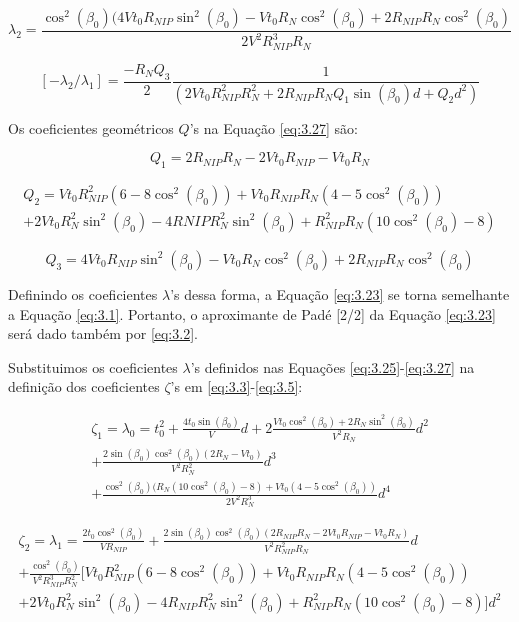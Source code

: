 \begin{equation}
\label{eq:6.26}
\lambda_2=\frac{\cos^2(\beta_0)(4Vt_0R_{NIP}\sin^2(\beta_0)-Vt_0R_N\cos^2(\beta_0)+2R_{NIP}R_N\cos^2(\beta_0)}{2V^2R_{NIP}^3R_N}
\end{equation}

\begin{equation}
\label{eq:6.27}
 [-\lambda_2/\lambda_1]=\frac{-R_NQ_3}{2}\frac{1}{(2Vt_0R_{NIP}^2R_N^2+2R_{NIP}R_NQ_1\sin(\beta_0)d+Q_2d^2)}
\end{equation}

Os coeficientes geométricos $Q$'s na Equação \ref{eq:3.27} são:

\begin{equation}
\label{eq:6.28}
 Q_1=2R_{NIP}R_N-2Vt_0R_{NIP}-Vt_0R_N
\end{equation}

\begin{multline}
\label{eq:6.29}
 Q_2=Vt_0R_{NIP}^2(6-8\cos^2(\beta_0))+Vt_0R_{NIP}R_N(4-5\cos^2(\beta_0)) \\
 +2Vt_0R_N^2\sin^2(\beta_0)-4R{NIP}R_N^2\sin^2(\beta_0)+R_{NIP}^2R_N(10\cos^2(\beta_0)-8)
\end{multline}

\begin{equation}
\label{eq:6.30}
 Q_3=4Vt_0R_{NIP}\sin^2(\beta_0)-Vt_0R_N\cos^2(\beta_0)+2R_{NIP}R_N\cos^2(\beta_0)
\end{equation}

Definindo os coeficientes $\lambda$'s dessa forma, a Equação \ref{eq:3.23} se torna semelhante a
Equação \ref{eq:3.1}. Portanto,
o aproximante de Padé [2/2] da Equação \ref{eq:3.23} será dado também por \ref{eq:3.2}.

Substituimos os coeficientes $\lambda$'s definidos nas Equações
\ref{eq:3.25}-\ref{eq:3.27} na definição dos coeficientes $\zeta$'s
em \ref{eq:3.3}-\ref{eq:3.5}:

\begin{multline}
\label{eq:6.31}
 \zeta_1=\lambda_0=t_0^2+\frac{4t_0\sin(\beta_0)}{V}d+2\frac{Vt_0\cos^2(\beta_0)+2R_N\sin^2(\beta_0)}{V^2R_N}d^2 \\
+\frac{2\sin(\beta_0)\cos^2(\beta_0)(2R_N-Vt_0)}{V^2R_N^2}d^3 \\
+\frac{\cos^2(\beta_0)(R_N(10\cos^2(\beta_0)-8)+Vt_0(4-5\cos^2(\beta_0))}{2V^2R_N^3}d^4 
\end{multline}

\begin{multline}
\label{eq:6.32}
 \zeta_2=\lambda_1=\frac{2t_0\cos^2(\beta_0)}{VR_{NIP}}+\frac{2\sin(\beta_0)\cos^2(\beta_0)(2R_{NIP}R_N-2Vt_0R_{NIP}-Vt_0R_N)}{V^2R_{NIP}^2R_N}d \\
+\frac{\cos^2(\beta_0)}{V^2R_{NIP}^3R_N^2}[Vt_0R_{NIP}^2(6-8\cos^2(\beta_0))+Vt_0R_{NIP}R_N(4-5\cos^2(\beta_0)) \\
+2Vt_0R_N^2\sin^2(\beta_0)-4R_{NIP}R_N^2\sin^2(\beta_0)+R_{NIP}^2R_N(10\cos^2(\beta_0)-8)]d^2
\end{multline}

